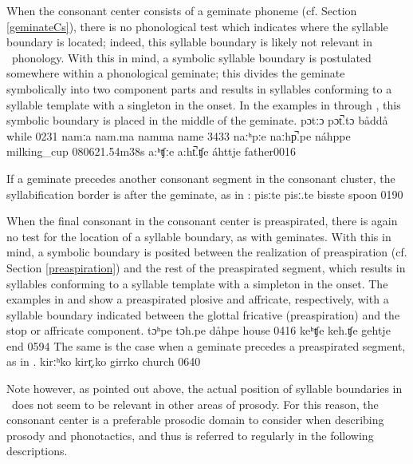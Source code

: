 When the consonant center consists of a geminate phoneme (cf. Section \ref{geminateCs}), there is no phonological test which indicates where the syllable boundary is located; 
indeed, this syllable boundary is likely not relevant in \PS\ phonology. With this in mind, a symbolic syllable boundary is postulated somewhere within a phonological geminate; this divides the geminate symbolically into two component parts and results in syllables conforming to a syllable template with a singleton in the onset. In the examples in  through , this symbolic boundary is placed in the middle of the geminate.
	{pɔtːɔ}	{pɔt̚.tɔ}		{båddå}	{while\BS{}}		{0231}
	{namːa}	{nam.ma}		{namma}	{name\BS{}}		{3433}
	{naːʰpːe}	{naːhp̚.pe}	{náhppe}	{milking\_cup\BS{}}	{080621}{.54m38s}
		{a:ʰʧːe}	{a:ht̚.ʧe}	{áhttje}	{father\BS{}}{0016}

If a geminate precedes another consonant segment in the consonant cluster, the syllabification border is after the geminate, as in :
	{pisːte}	{pisː.te}		{bisste}	{spoon\BS{}}		{0190}

When the final consonant in the consonant center is preaspirated, there is again no test for the location of a syllable boundary, as with geminates. With this in mind, a symbolic boundary is posited between the realization of preaspiration (cf. Section \ref{preaspiration}) and the rest of the preaspirated segment, which results in syllables conforming to a syllable template with a simpleton in the onset. The examples in  and  show a preaspirated plosive and affricate, respectively, with a syllable boundary indicated between the glottal fricative (preaspiration) and the stop or affricate component.
	{tɔʰpe}	{tɔh.pe}		{dåhpe}	{house\BS{}}		{0416}
		{keʰʧe}	{keh.ʧe}		{gehtje}	{end\BS{}}		{0594}
The same is the case when a geminate precedes a preaspirated segment, as in . %
	{kirːʰko}	{kirr̥.ko}		{girrko}	{church\BS{}}		{0640}

Note however, as pointed out above, the actual position of syllable boundaries in \PS\ does not seem to be relevant in other areas of prosody. 
For this reason, the consonant center is a preferable prosodic domain to consider when describing prosody and phonotactics, and thus is referred to regularly in the following descriptions.



